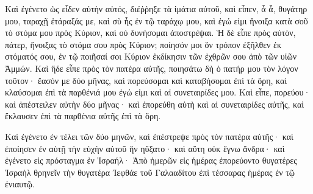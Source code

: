 {Καὶ ἐγένετο ὡς εἶδεν αὐτὴν αὐτός, διέῤῥηξε τὰ ἱμάτια αὐτοῦ, καὶ εἶπεν, ἆ ἆ, θυγάτηρ μου, ταραχῇ ἐτάραξάς με, καὶ σὺ ἦς ἐν τῷ ταράχῳ μου, καὶ ἐγώ εἰμι ἤνοιξα κατὰ σοῦ τὸ στόμα μου πρὸς Κύριον, καὶ οὐ δυνήσομαι ἀποστρέψαι.
Ἡ δὲ εἶπε πρὸς αὐτὸν, πάτερ, ἤνοιξας τὸ στόμα σου πρὸς Κύριον; ποίησόν μοι ὃν τρόπον ἐξῆλθεν ἐκ στόματός σου, ἐν τῷ ποιῆσαί σοι Κύριον ἐκδίκησιν τῶν ἐχθρῶν σου ἀπὸ τῶν υἱῶν Ἀμμών.
Καὶ ἥδε εἶπε πρὸς τὸν πατέρα αὐτῆς, ποιησάτω δὴ ὁ πατήρ μου τὸν λόγον τοῦτον· ἔασόν με δύο μῆνας, καὶ πορεύσομαι καὶ καταβήσομαι ἐπὶ τὰ ὄρη, καὶ κλαύσομαι ἐπὶ τὰ παρθένιά μου ἐγώ εἰμι καὶ αἱ συνεταιρίδες μου.
Καὶ εἶπε, πορεύου· καὶ ἀπέστειλεν αὐτὴν δύο μῆνας· καὶ ἐπορεύθη αὐτὴ καὶ αἱ συνεταιρίδες αὐτῆς, καὶ ἔκλαυσεν ἐπὶ τὰ παρθένια αὐτῆς ἐπὶ τὰ ὄρη.
\par }{\PP {}Καὶ ἐγένετο ἐν τέλει τῶν δύο μηνῶν, καὶ ἐπέστρεψε πρὸς τὸν πατέρα αὐτῆς· καὶ ἐποίησεν ἐν αὐτῇ τὴν εὐχὴν αὐτοῦ ἣν ηὔξατο· καὶ αὕτη οὐκ ἔγνω ἄνδρα· καὶ ἐγένετο εἰς πρόσταγμα ἐν Ἰσραήλ·
Ἀπὸ ἡμερῶν εἰς ἡμέρας ἐπορεύοντο θυγατέρες Ἰσραὴλ θρηνεῖν τὴν θυγατέρα Ἰεφθάε τοῦ Γαλααδίτου ἐπὶ τέσσαρας ἡμέρας ἐν τῷ ἐνιαυτῷ.

}
